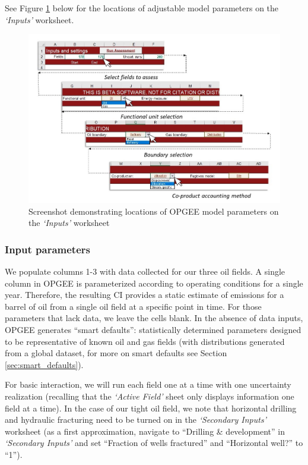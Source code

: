 \documentclass[11pt]{report}
\newcommand{\sheet}[1]{\textit{`{#1}'}}
\begin{document}
See Figure \ref{fig:lca_specs} below for the locations of adjustable model parameters on the \sheet{Inputs} worksheet.

\begin{figure}
\includegraphics[width=1\columnwidth]{documentation/images/User_Guide_figs/lcaspecs_2.jpg}
\caption{Screenshot demonstrating locations of OPGEE model parameters on the \sheet{Inputs} worksheet}
\label{fig:lca_specs}
\end{figure}

\subsubsection{Input parameters}

We populate columns 1-3 with data collected for our three oil fields. A single column in OPGEE is parameterized according to operating conditions for a single year. Therefore, the resulting CI provides a static estimate of emissions for a barrel of oil from a single oil field at a specific point in time. For those parameters that lack data, we leave the cells blank. In the absence of data inputs, OPGEE generates ``smart defaults'': statistically determined parameters designed to be representative of known oil and gas fields (with distributions generated from a global dataset, for more on smart defaults see Section \ref{sec:smart_defaults}). 

For basic interaction, we will run each field one at a time with one uncertainty realization (recalling that the \sheet{Active Field} sheet only displays information one field at a time). In the case of our tight oil field, we note that horizontal drilling and hydraulic fracturing need to be turned on in the \sheet{Secondary Inputs} worksheet (as a first approximation, navigate to ``Drilling & development'' in \sheet{Secondary Inputs} and set ``Fraction of wells fractured'' and ``Horizontal well?'' to ``1'').
\end{document}
